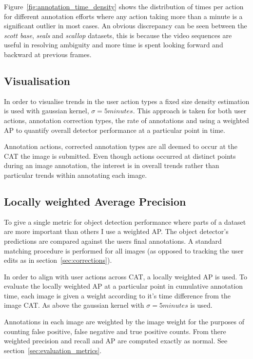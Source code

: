 Figure~\ref{fig:annotation_time_density} shows the distribution of times per action for different annotation efforts where any action taking more than a minute is a significant outlier in most cases. An obvious discrepancy can be seen between the \emph{scott base}, \emph{seals} and \emph{scallop} datasets, this is because the video sequences are useful in resolving ambiguity and more time is spent looking forward and backward at previous frames.

\subsection{Visualisation}
\label{sec:visualisation}

In order to visualise trends in the user action types a fixed size density estimation is used with gaussian kernel, $\sigma=5 minutes$. This approach is taken for both user actions, annotation correction types, the rate of annotations and using a weighted \gls{AP} to quantify overall detector performance at a particular point in  time.

Annotation actions, corrected annotation types are all deemed to occur at the \gls{CAT} the image is submitted. Even though actions occurred at distinct points during an image annotation, the interest is in overall trends rather than particular trends within annotating each image. 

\subsection {Locally weighted Average Precision}
\label{sec:noisy_trends}

To give a single metric for object detection performance where parts of a dataset are more important than others I use a weighted \gls{AP}. The object detector's predictions are compared against the users final annotations. A standard matching procedure is performed for all images (as opposed to tracking the user edits as in section~\ref{sec:corrections}).

In order to align with user actions across \gls{CAT}, a locally weighted \gls{AP} is used. To evaluate the locally weighted \gls{AP} at a particular point in cumulative annotation time, each image is given a weight according to it's time difference from the image \gls{CAT}. As above the gaussian kernel with $\sigma=5 minutes$ is used.

Annotations in each image are weighted by the image weight for the purposes of counting false positive, false negative and true positive counts. From there weighted precision and recall and \gls{AP} are computed exactly as normal. See section~\ref{sec:evaluation_metrics}.


